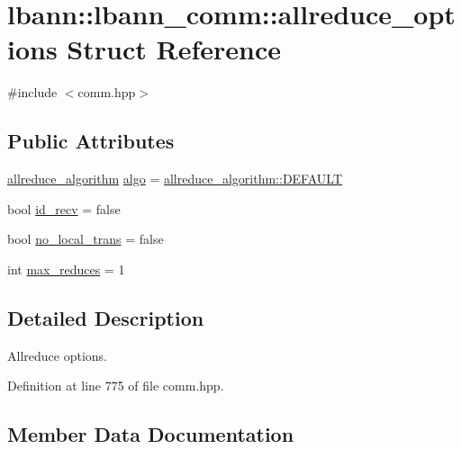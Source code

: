 \hypertarget{structlbann_1_1lbann__comm_1_1allreduce__options}{}\section{lbann\+:\+:lbann\+\_\+comm\+:\+:allreduce\+\_\+options Struct Reference}
\label{structlbann_1_1lbann__comm_1_1allreduce__options}


{\ttfamily \#include $<$comm.\+hpp$>$}

\subsection*{Public Attributes}
\begin{DoxyCompactItemize}
\item 
\hyperlink{classlbann_1_1lbann__comm_a02a03227cc27e3516f0d9f9812f32019}{allreduce\+\_\+algorithm} \hyperlink{structlbann_1_1lbann__comm_1_1allreduce__options_a8cb30eb49f6556debf08291056d036e9}{algo} = \hyperlink{classlbann_1_1lbann__comm_a02a03227cc27e3516f0d9f9812f32019a5b39c8b553c821e7cddc6da64b5bd2ee}{allreduce\+\_\+algorithm\+::\+D\+E\+F\+A\+U\+LT}
\item 
bool \hyperlink{structlbann_1_1lbann__comm_1_1allreduce__options_a91ab3b21e8345915d3a8eedb65c2f52e}{id\+\_\+recv} = false
\item 
bool \hyperlink{structlbann_1_1lbann__comm_1_1allreduce__options_ad9890ae127412ee65a98cbdb02a4b143}{no\+\_\+local\+\_\+trans} = false
\item 
int \hyperlink{structlbann_1_1lbann__comm_1_1allreduce__options_a4b3cd4eb74dd5a49ee3ffafa2edc1607}{max\+\_\+reduces} = 1
\end{DoxyCompactItemize}


\subsection{Detailed Description}
Allreduce options. 

Definition at line 775 of file comm.\+hpp.



\subsection{Member Data Documentation}
\mbox{\label{structlbann_1_1lbann__comm_1_1allreduce__options_a8cb30eb49f6556debf08291056d036e9}} 
